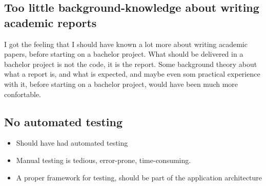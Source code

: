 \subsection{Too little background-knowledge about writing academic reports}

I got the feeling that I should have known a lot more about writing academic papers, before starting on a bachelor project. What should be delivered in a bachelor project is not the code, it is the report. Some background theory about what a report is, and what is expected, and maybe even som practical experience with it, before starting on a bachelor project, would have been much more confortable.



\subsection{No automated testing}

\begin{itemize}
    \item Should have had automated testing
    \item Manual testing is tedious, error-prone, time-consuming.
    \item A proper framework for testing, should be part of the application architecture
\end{itemize}

